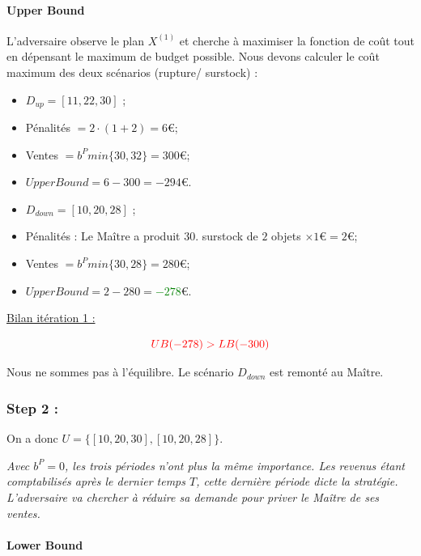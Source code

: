 \documentclass[11pt,a4paper]{article}
\begin{document}
    \paragraph{Upper Bound} L'adversaire observe le plan $X^{(1)}$ et cherche à maximiser la fonction de coût tout en dépensant le maximum de budget possible. Nous devons calculer le coût maximum des deux scénarios (rupture/ surstock) :
    
    \begin{itemize}
    Scénario 1 : Attaque $D_{up}$ (rupture)
        \item $D_{up}=[11, 22, 30]$ ;
        \item Pénalités $=2\cdot(1+2)=6$\euro ;
        \item Ventes $=b^Pmin\{30, 32\}=300$\euro ;
        \item $UpperBound=6-300=-294$\euro.
    \end{itemize}
    
    \begin{itemize}
    Scénario 2 : Attaque $D_{down}$ (surstock)
        \item $D_{down}=[10, 20, 28]$ ;
        \item Pénalités : Le Maître a produit $30$. surstock de $2$ objets $\times 1$\euro$=2$\euro ;
        \item Ventes $=b^Pmin\{30, 28\}=280$\euro ;
        \item $UpperBound=2-280=$\textcolor{green}{$-278$}\euro.
    \end{itemize}
    
    \underline{Bilan itération 1 :}
    
    \[
        \textcolor{red}{UB(-278) > LB(-300)}
    \]
    
    Nous ne sommes pas à l'équilibre. Le scénario $D_{down}$ est remonté au Maître.
    
    \subsubsection{Step 2 :}
    
    On a donc $U=\{[10, 20, 30], [10, 20, 28]\}$.
    
    \textit{Avec $b^P=0$,  les trois périodes n'ont plus la même importance. Les revenus étant comptabilisés après le dernier temps $T$, cette dernière période dicte la stratégie. L'adversaire va chercher à réduire sa demande pour priver le Maître de ses ventes.}
    
    \paragraph{Lower Bound}
    
\end{document}
